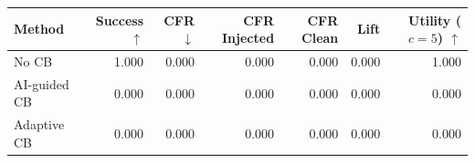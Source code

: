 \begin{tabular}{lrrrrrr}
\toprule
Method & Success $\uparrow$ & CFR $\downarrow$ & CFR Injected & CFR Clean & Lift & Utility ($c=5$) $\uparrow$ \\
\midrule
No CB & 1.000 & 0.000 & 0.000 & 0.000 & 0.000 & 1.000 \\
AI-guided CB & 0.000 & 0.000 & 0.000 & 0.000 & 0.000 & 0.000 \\
Adaptive CB & 0.000 & 0.000 & 0.000 & 0.000 & 0.000 & 0.000 \\
\bottomrule
\end{tabular}
